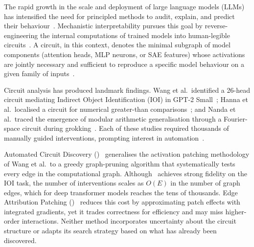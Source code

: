 
The rapid growth in the scale and deployment of large language models (LLMs) has
intensified the need for principled methods to audit, explain, and predict their
behaviour~\cite{Bereska2024}. Mechanistic interpretability pursues this goal by
reverse-engineering the internal computations of trained models into human-legible
circuits~\cite{Olah2020,Elhage2021}. A circuit, in this context, denotes the minimal
subgraph of model components (attention heads, MLP neurons, or SAE features) whose
activations are jointly necessary and sufficient to reproduce a specific model
behaviour on a given family of inputs~\cite{Cammarata2020,Wang2022}.

Circuit analysis has produced landmark findings. Wang et al.\ identified a
26-head circuit mediating Indirect Object Identification (IOI) in GPT-2
Small~\cite{Wang2022}; Hanna et al.\ localised a circuit for numerical
greater-than comparisons~\cite{Hanna2023}; and Nanda et al.\ traced the emergence of
modular arithmetic generalisation through a Fourier-space circuit during
grokking~\cite{Nanda2023Grokking}. Each of these studies required thousands of
manually guided interventions, prompting interest in automation~\cite{Conmy2023,Syed2023}.

Automated Circuit Discovery (\ACDC)~\cite{Conmy2023} generalises the activation
patching methodology of Wang et al.\ to a greedy graph-pruning algorithm that
systematically tests every edge in the computational graph. Although \ACDC\ achieves
strong fidelity on the IOI task, the number of interventions scales as $O(E)$ in the
number of graph edges, which for deep transformer models reaches the tens of
thousands. Edge Attribution Patching (\EAP)~\cite{Syed2023} reduces this cost by
approximating patch effects with integrated gradients, yet it trades correctness for
efficiency and may miss higher-order interactions. Neither method incorporates
uncertainty about the circuit structure or adapts its search strategy based on what
has already been discovered.

